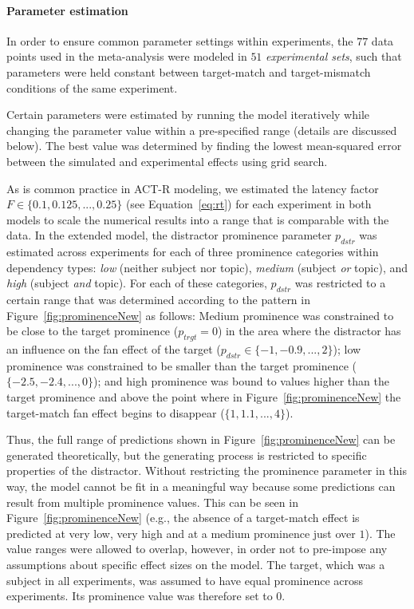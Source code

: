 \documentclass{cambridge7A}\usepackage[]{graphicx}\usepackage[]{color}
\newcommand{\revisedII}[1]{#1}
\begin{document}
\paragraph{Parameter estimation}
In order to ensure common parameter settings within experiments, the $77$ data points used in the meta-analysis were modeled in $51$ \emph{experimental sets}, such that parameters were held constant between target-match and target-mismatch conditions of the same experiment.
\revisedII{
Certain parameters were estimated by running the model iteratively while changing the parameter value within a pre-specified range (details are discussed below). 
The best value was determined by finding the lowest mean-squared error between the simulated and experimental effects using grid search.

As is common practice in ACT-R modeling, we estimated the latency factor $F \in \{0.1, 0.125, ..., 0.25\}$ (see Equation~\ref{eq:rt}) for each experiment in both models to scale the numerical results into a range that is comparable with the data.
In the extended model, the distractor prominence parameter $p_{dstr}$ was estimated across experiments for each of three prominence categories within dependency types: \emph{low} (neither subject nor topic), \emph{medium} (subject \emph{or} topic), and \emph{high} (subject \emph{and} topic).
For each of these categories, $p_{dstr}$ was restricted to a certain range that was determined according to the pattern in Figure~\ref{fig:prominenceNew} as follows:
Medium prominence was constrained to be close to the target prominence ($p_{trgt} = 0$) in the area where the distractor has an influence on the fan effect of the target ($p_{dstr} \in \{-1, -0.9, ..., 2\}$); low prominence was constrained to be smaller than the target prominence ($\{-2.5, -2.4, ..., 0\}$); and high prominence was bound to values higher than the target prominence and above the point where in Figure~\ref{fig:prominenceNew} the target-match fan effect begins to disappear ($\{1, 1.1, ..., 4\}$).

Thus, the full range of predictions shown in Figure~\ref{fig:prominenceNew} can be generated theoretically, but the generating process is restricted to specific properties of the distractor. 
Without restricting the prominence parameter in this way, the model cannot be fit in a meaningful way because some predictions can result from multiple prominence values. This can be seen in Figure~\ref{fig:prominenceNew} (e.g., the absence of a target-match effect is predicted at very low, very high and at a medium prominence just over $1$).
The value ranges were allowed to overlap, however, in order not to pre-impose any assumptions about specific effect sizes on the model.
The target, which was a subject in all experiments, was assumed to have equal prominence across experiments. Its prominence value was therefore set to $0$.
}
\end{document}
